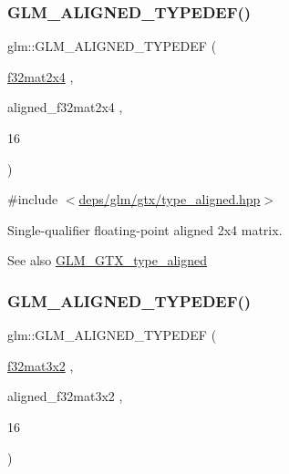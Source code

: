 \subsubsection{\texorpdfstring{G\+L\+M\+\_\+\+A\+L\+I\+G\+N\+E\+D\+\_\+\+T\+Y\+P\+E\+D\+E\+F()}{GLM\_ALIGNED\_TYPEDEF()}\hspace{0.1cm}{\footnotesize\ttfamily [186/209]}}
{\footnotesize\ttfamily glm\+::\+G\+L\+M\+\_\+\+A\+L\+I\+G\+N\+E\+D\+\_\+\+T\+Y\+P\+E\+D\+EF (\begin{DoxyParamCaption}\item[{\hyperlink{group__gtc__type__precision_ga56deb277c1d5c1f42a80982372b4ed6c}{f32mat2x4}}]{,  }\item[{aligned\+\_\+f32mat2x4}]{,  }\item[{16}]{ }\end{DoxyParamCaption})}



{\ttfamily \#include $<$\hyperlink{gtx_2type__aligned_8hpp}{deps/glm/gtx/type\+\_\+aligned.\+hpp}$>$}

Single-\/qualifier floating-\/point aligned 2x4 matrix. \begin{DoxySeeAlso}{See also}
\hyperlink{group__gtx__type__aligned}{G\+L\+M\+\_\+\+G\+T\+X\+\_\+type\+\_\+aligned} 
\end{DoxySeeAlso}
\mbox{\label{group__gtx__type__aligned_gac09663c42566bcb58d23c6781ac4e85a}} 
\subsubsection{\texorpdfstring{G\+L\+M\+\_\+\+A\+L\+I\+G\+N\+E\+D\+\_\+\+T\+Y\+P\+E\+D\+E\+F()}{GLM\_ALIGNED\_TYPEDEF()}\hspace{0.1cm}{\footnotesize\ttfamily [187/209]}}
{\footnotesize\ttfamily glm\+::\+G\+L\+M\+\_\+\+A\+L\+I\+G\+N\+E\+D\+\_\+\+T\+Y\+P\+E\+D\+EF (\begin{DoxyParamCaption}\item[{\hyperlink{group__gtc__type__precision_ga924b933089d954df062aa8d0735fc005}{f32mat3x2}}]{,  }\item[{aligned\+\_\+f32mat3x2}]{,  }\item[{16}]{ }\end{DoxyParamCaption})}



